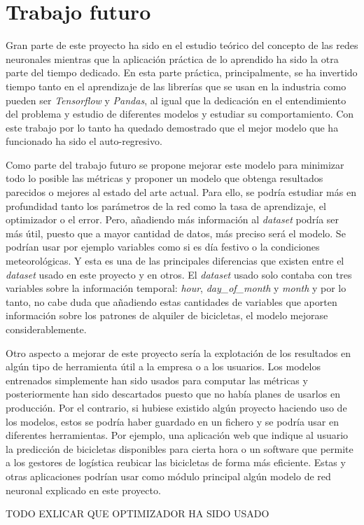 \section{Trabajo futuro}\label{future_work}

Gran parte de este proyecto ha sido en el estudio teórico del concepto de las redes neuronales mientras que la aplicación práctica de lo aprendido ha sido la otra parte del tiempo dedicado. En esta parte práctica, principalmente, se ha invertido tiempo tanto en el aprendizaje de las librerías que se usan en la industria como pueden ser \textit{Tensorflow} y \textit{Pandas}, al igual que la dedicación en el entendimiento del problema y estudio de diferentes modelos y estudiar su comportamiento. Con este trabajo por lo tanto ha quedado demostrado que el mejor modelo que ha funcionado ha sido el auto-regresivo.
\newline

Como parte del trabajo futuro se propone mejorar este modelo para minimizar todo lo posible las métricas y proponer un modelo que obtenga resultados parecidos o mejores al estado del arte actual. Para ello, se podría estudiar más en profundidad tanto los parámetros de la red como la tasa de aprendizaje, el optimizador o el error. Pero, añadiendo más información al \textit{dataset} podría ser más útil, puesto que a mayor cantidad de datos, más preciso será el modelo. Se podrían usar por ejemplo variables como si es día festivo o la condiciones meteorológicas. Y esta es una de las principales diferencias que existen entre el \textit{dataset} usado en este proyecto y en otros. El \textit{dataset} usado solo contaba con tres variables sobre la información temporal: \textit{hour}, \textit{day\_of\_month} y \textit{month} y por lo tanto, no cabe duda que añadiendo estas cantidades de variables que aporten información sobre los patrones de alquiler de bicicletas, el modelo mejorase considerablemente.
\newline

Otro aspecto a mejorar de este proyecto sería la explotación de los resultados en algún tipo de herramienta útil a la empresa o a los usuarios. Los modelos entrenados simplemente han sido usados para computar las métricas y posteriormente han sido descartados puesto que no había planes de usarlos en producción. Por el contrario, si hubiese existido algún proyecto haciendo uso de los modelos, estos se podría haber guardado en un fichero y se podría usar en diferentes herramientas. Por ejemplo, una aplicación web que indique al usuario la predicción de bicicletas disponibles para cierta hora o un software que permite a los gestores de logística reubicar las bicicletas de forma más eficiente. Estas y otras aplicaciones podrían usar como módulo principal algún modelo de red neuronal explicado en este proyecto.
\newline





TODO EXLICAR QUE OPTIMIZADOR HA SIDO USADO

